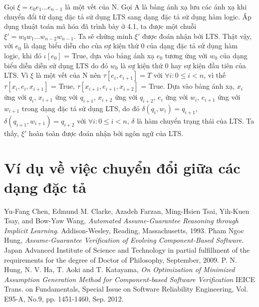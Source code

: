 \documentclass[a4paper,13pt,oneside,openany]{book}
\begin{document}
\begin{flushleft}
		Gọi $\xi = e_0e_1...e_{n-1}$ là một vết của N. Gọi A là bảng ánh xạ lưu các ánh xạ khi chuyển đổi từ dạng đặc tả sử dụng LTS sang dạng đặc tả sử dụng hàm logic. Áp dụng thuật toán mã hóa đã trình bày ở 4.1, ta được một chuỗi $\xi' = w_0w_1...w_{n-2}w_{n-1}$. Ta sẽ chứng minh $\xi'$ được đoán nhận bởi LTS. Thật vậy, với $e_0$ là dạng biểu diễn cho của sự kiện thứ 0 của dạng đặc tả sử dụng hàm logic, khi đó $\iota[e_0]$ = True, dựa vào bảng ánh xạ $e_0$ tương ứng với  $w_{0}$ của dạng biểu diễn diễn sử dụng LTS do đó $w_{0}$ là sự kiện thứ 0 hay sự kiện đầu tiên của LTS. Vì $\xi$ là một vết của N nên $\tau[e_i,e_{i+1}] = T$ với $\forall i: 0 \leq i < n$, vì thế $\tau[x_i, e_i, x_{i+1}]$ = True, $\tau[x_{i+1}, e_{i+1}, x_{i+2}]$ = True. Dựa vào bảng ánh xạ, $x_i$ ứng với $q_i$, $x_{i+1}$ ứng với $q_{i+1}$, $x_{i+2}$ ứng với $q_{i+2}$, $e_i$ ứng với $w_i$, $e_{i+1}$ ứng với $w_{i+1}$ trong dạng đặc tả sử dụng LTS, do đó $\delta(q_{i}, w_{i}) = q_{i+1}$, $\delta(q_{i+1}, w_{i+1}) = q_{i+2}$ với $\forall i: 0 \leq i < n$, $\delta$ là hàm chuyển trạng thái của LTS. Ta thấy, $\xi'$ hoàn toàn được đoán nhận bởi ngôn ngữ của LTS.
	\chapter{Ví dụ về việc chuyển đổi giữa các dạng đặc tả}
	\end{flushleft}
\begin{thebibliography}{9}
	Yu-Fang Chen, Edmund M. Clarke, Azadeh Farzan, Ming-Hsien Tsai,
	Yih-Kuen Tsay, and Bow-Yaw Wang, \textit{Automated Assume-Guarantee Reasoning
		through Implicit Learning}. 
	Addison-Wesley, Reading, Massachusetts, 1993.
	Pham Ngoc Hung, \textit{Assume-Guarantee Verification of Evolving Component-Based Software}.
	Japan Advanced Institute of Science and Technology in partial fulfillment of the requirements for the degree of Doctor of Philosophy, September, 2009.
	P. N. Hung, N. V.  Ha, T. Aoki and T. Katayama, \textit{On Optimization of Minimized Assumption Generation Method for Component-based Software Verification}
	IEICE Trans. on Fundamentals, Special Issue on Software Reliability Engineering, Vol. E95-A, No.9, pp. 1451-1460, Sep. 2012.
\end{thebibliography}
\end{document}
